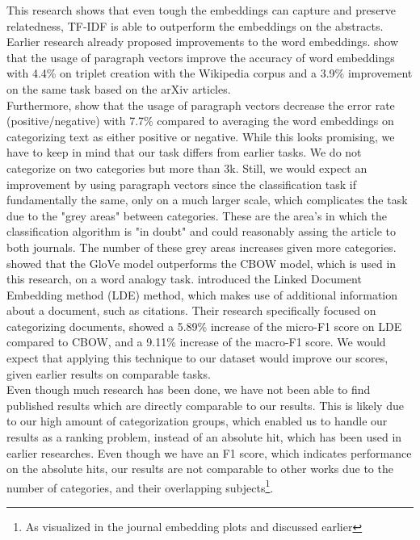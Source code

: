 \documentclass[../../Thesis.tex]{subfiles}
\begin{document}
This research shows that even tough the embeddings can capture and preserve relatedness, TF-IDF is able to outperform the embeddings on the abstracts. Earlier research already proposed improvements to the word embeddings. \citet{dai2015document} show that the usage of paragraph vectors improve the accuracy of word embeddings with 4.4\% on triplet creation with the Wikipedia corpus and a 3.9\% improvement on the same task based on the arXiv articles.\\
Furthermore, \citet{le2014distributed} show that the usage of paragraph vectors decrease the error rate (positive/negative) with 7.7\% compared to averaging the word embeddings on categorizing text as either positive or negative. While this looks promising, we have to keep in mind that our task differs from earlier tasks. We do not categorize on two categories but more than 3k. Still, we would expect an improvement by using paragraph vectors since the classification task if fundamentally the same, only on a much larger scale, which complicates the task due to the "grey areas"  between categories. These are the area's in which the classification algorithm is "in doubt" and could reasonably assing the article to both journals. The number of these grey areas increases given more categories. \citet{pennington2014glove} showed that the GloVe model outperforms the CBOW model, which is used in this research, on a word analogy task. \citet{wang2016linked} introduced the Linked Document Embedding method (LDE) method, which makes use of additional information about a document, such as citations. Their research specifically focused on categorizing documents, showed a 5.89\% increase of the micro-F1 score on LDE compared to CBOW, and a 9.11\% increase of the macro-F1 score. We would expect that applying this technique to our dataset would improve our scores, given earlier results on comparable tasks.\\
Even though much research has been done, we have not been able to find published results which are directly comparable to our results. This is likely due to our high amount of categorization groups, which enabled us to handle our results as a ranking problem, instead of an absolute hit, which has been used in earlier researches\cite{wang2016linked}. Even though we have an F1 score, which indicates performance on the absolute hits, our results are not comparable to other works due to the number of categories, and their overlapping subjects\footnote{As visualized in the journal embedding plots and discussed earlier}.
\end{document}
